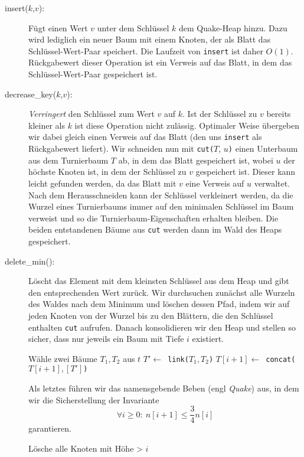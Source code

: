 \documentclass[a4paper,10pt]{article}
\begin{document}
\begin{description}
\item[insert($k$,$v$):]
    Fügt einen Wert $v$ unter dem Schlüssel $k$ dem Quake-Heap hinzu. Dazu wird lediglich ein neuer Baum mit einem Knoten, der als Blatt das Schlüssel-Wert-Paar speichert. 
    Die Laufzeit von \verb!insert! ist daher $O(1)$. 
    Rückgabewert dieser Operation ist ein Verweis auf das Blatt, in dem das Schlüssel-Wert-Paar gespeichert ist.
\item[decrease\_key($k$,$v$):]
    \emph{Verringert} den Schlüssel zum Wert $v$ auf $k$. Ist der Schlüssel zu $v$ bereits kleiner als $k$ ist diese Operation nicht zulässig.
    Optimaler Weise übergeben wir dabei gleich einen Verweis auf das Blatt (den uns \verb!insert! als Rückgabewert liefert).
    Wir schneiden nun mit \verb!cut(!$T$, $u$\verb!)! einen Unterbaum aus dem Turnierbaum $T$ ab, in dem das Blatt gespeichert ist, wobei $u$ der höchste Knoten ist, in dem der Schlüssel zu $v$ gespeichert ist.
    Dieser kann leicht gefunden werden, da das Blatt mit $v$ eine Verweis auf $u$ verwaltet.
    Nach dem Herausschneiden kann der Schlüssel verkleinert werden, da die Wurzel eines Turnierbaums immer auf den minimalen Schlüssel im Baum verweist und so die Turnierbaum-Eigenschaften erhalten bleiben.
    Die beiden entstandenen Bäume aus \verb!cut! werden dann im Wald des Heaps gespeichert.
\item[delete\_min():]
    Löscht das Element mit dem kleinsten Schlüssel aus dem Heap und gibt den entsprechenden Wert zurück.
    Wir durchsuchen zunächst alle Wurzeln des Waldes nach dem Minimum und löschen dessen Pfad, indem wir auf jeden Knoten von der Wurzel bis zu den Blättern, die den Schlüssel enthalten \verb!cut! aufrufen.
    Danach konsolidieren wir den Heap und stellen so sicher, dass nur jeweils ein Baum mit Tiefe $i$ existiert.
    \begin{algorithmic}
            \STATE Wähle zwei Bäume $T_1, T_2$ aus $t$
            \STATE $T' \gets$\ \verb!link(!$T_1, T_2$\verb!)!
            \STATE $T[i+1] \gets$\ \verb!concat(!$T[i+1], [T']$\verb!)!
        \ENDWHILE
    \ENDFOR
    \end{algorithmic}
    Als letztes führen wir das namensgebende Beben (engl \emph{Quake}) aus, in dem wir die Sicherstellung der Invariante
    \[\forall i \geq 0{:}\ n[i+1] \leq \frac{3}{4} n[i]\]
    garantieren.
    \begin{algorithmic}
            \STATE Lösche alle Knoten mit Höhe > $i$
        \ENDIF
    \ENDFOR
    \end{algorithmic}
\end{description}
\end{document}
